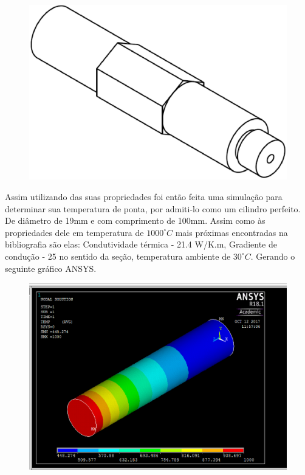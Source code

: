 \begin{figure}[!htb]                                                               
   \centering                                                                      
   \includegraphics[scale=0.4, keepaspectratio=true]{figuras/Parte1.eps}                     
\end{figure}

Assim utilizando das suas propriedades foi então feita uma simulação para determinar sua temperatura de ponta, por admiti-lo como um cilindro perfeito. De diâmetro de 19mm e com comprimento de 100mm. Assim como às propriedades dele em temperatura de $1000^{\circ}C$ mais próximas encontradas na bibliografia são elas: Condutividade térmica - 21.4 W/K.m, Gradiente de condução - 25 no sentido da seção, temperatura ambiente de $30^{\circ}C$. Gerando o seguinte gráfico ANSYS.

\begin{figure}[!htb]                                                               
   \centering                                                                      
   \includegraphics[scale=0.4, keepaspectratio=true]{figuras/Resultado1.eps}                     
\end{figure}

